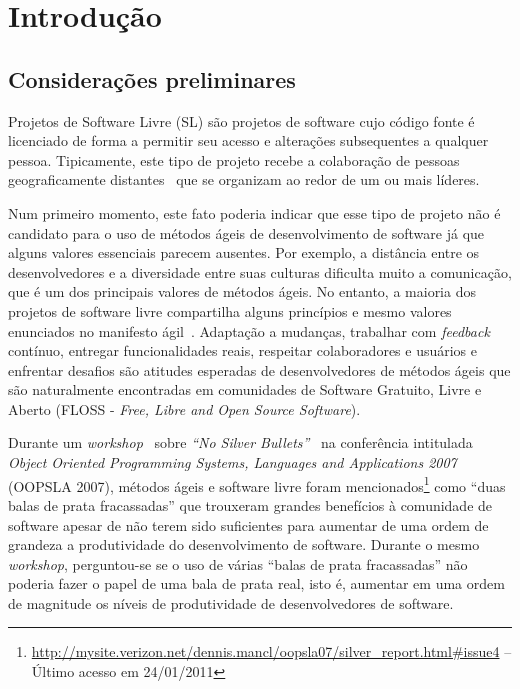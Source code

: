 \chapter{Introdução}
\label{cap:introducao}

\section{Considerações preliminares}
\label{sec:consideracoes_preliminares}

Projetos de Software Livre (SL) são projetos de software cujo código
fonte é licenciado de forma a permitir seu acesso e alterações
subsequentes a qualquer pessoa. Tipicamente, este tipo de projeto
recebe a colaboração de pessoas geograficamente
distantes~\cite{Dempsey1999} que se organizam ao redor de um ou mais
líderes.

Num primeiro momento, este fato poderia indicar que esse tipo de
projeto não é candidato para o uso de métodos ágeis de desenvolvimento
de software já que alguns valores essenciais parecem ausentes. Por
exemplo, a distância entre os desenvolvedores e a diversidade entre
suas culturas dificulta muito a comunicação, que é um dos principais
valores de métodos ágeis. No entanto, a maioria dos projetos de
software livre compartilha alguns princípios e mesmo valores
enunciados no manifesto ágil~\cite{AgileManifesto}. Adaptação a
mudanças, trabalhar com \emph{feedback} contínuo, entregar
funcionalidades reais, respeitar colaboradores e usuários e enfrentar
desafios são atitudes esperadas de desenvolvedores de métodos ágeis
que são naturalmente encontradas em comunidades de Software Gratuito,
Livre e Aberto (FLOSS - \emph{Free, Libre and Open Source Software}).

Durante um \emph{workshop}~\cite{OOPSLA07} sobre \emph{``No Silver
  Bullets''}~\cite{Brooks1987} na conferência intitulada \emph{Object
  Oriented Programming Systems, Languages and Applications 2007}
(OOPSLA 2007), métodos ágeis e software livre foram
mencionados\footnote{\url{http://mysite.verizon.net/dennis.mancl/oopsla07/silver_report.html\#issue4}
  -- Último acesso em 24/01/2011} como ``duas balas de prata
fracassadas'' que trouxeram grandes benefícios à comunidade de
software apesar de não terem sido suficientes para aumentar de uma
ordem de grandeza a produtividade do desenvolvimento de
software. Durante o mesmo \emph{workshop}, perguntou-se se o uso de
várias ``balas de prata fracassadas'' não poderia fazer o papel de uma
bala de prata real, isto é, aumentar em uma ordem de magnitude os
níveis de produtividade de desenvolvedores de software.

